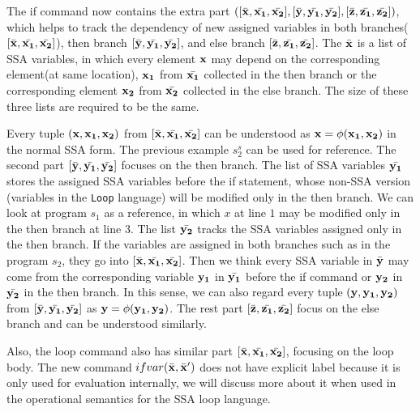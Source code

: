 The if command now contains the extra part $([\bar{{\bf{{x}}}}, \bar{{\bf{{x_1}}}}, \bar{{\bf{{x_2}}}}] , [\bar{{\bf{{y}}}}, \bar{{\bf{{y_1}}}}, \bar{{\bf{{y_2}}}}],[\bar{{\bf{{z}}}}, \bar{{\bf{{z_1}}}}, \bar{{\bf{{z_2}}}}] )$, which helps to track the dependency of new assigned variables in both branches($[\bar{{\bf{{x}}}}, \bar{{\bf{{x_1}}}}, \bar{{\bf{{x_2}}}}]$), then branch $[\bar{{\bf{{y}}}}, \bar{{\bf{{y_1}}}}, \bar{{\bf{{y_2}}}}]$, and else branch $[\bar{{\bf{{z}}}}, \bar{{\bf{{z_1}}}}, \bar{{\bf{{z_2}}}}] $. 
The $\bar{{\bf{{x}}}}$ is a list of SSA variables, in which every element ${\bf{{x}}}$ may depend on the corresponding element(at same location), ${\bf{{x_1}}}$ from $\bar{{\bf{{x_1}}}}$ collected in the then branch or the corresponding element ${\bf{{x_2}}}$ from $\bar{{\bf{{x_2}}}}$ collected in the else branch. The size of these three lists are required to be the same.

Every tuple $({\bf{{x,x_1,x_2 }}})$ from $[\bar{{\bf{{x}}}}, \bar{{\bf{{x_1}}}}, \bar{{\bf{{x_2}}}}]$ can be understood as ${\bf{{x}}} = \phi({\bf{{x_1,x_2}}})$ in the normal SSA form. The previous example $s_2^{s}$ can be used for reference. The second part $[\bar{{\bf{{y}}}}, \bar{{\bf{{y_1}}}}, \bar{{\bf{{y_2}}}}]$ focuses on the then branch. The list of SSA variables $\bar{{\bf{{y_1}}}}$ stores the assigned SSA variables before the if statement, whose non-SSA version (variables in the {\tt Loop} language) will be modified only in the then branch. We can look at program $s_1$ as a reference, in which $x$ at line $1$ may be modified only in the then branch at line $3$. The list $\bar{{\bf{{y_2}}}}$ tracks the SSA variables assigned only in the then branch. If the variables are assigned in both branches such as in the program $s_2$, they go into $[\bar{{\bf{{x}}}}, \bar{{\bf{{x_1}}}}, \bar{{\bf{{x_2}}}}]$. Then we think every SSA variable in $\bar{{\bf{{y}}}}$ may come from the corresponding variable ${\bf{{y_1}}}$ in $\bar{{\bf{{y_1}}}}$ before the if command or ${\bf{{y_2}}}$ in $\bar{{\bf{{y_2}}}}$ in the then branch. In this sense, we can also regard every tuple $({\bf{{y,y_1,y_2 }}})$ from $[\bar{{\bf{{y}}}}, \bar{{\bf{{y_1}}}}, \bar{{\bf{{y_2}}}}]$ as ${\bf{{y}}} = \phi({\bf{{y_1,y_2}}})$.  The rest part $[\bar{{\bf{{z}}}}, \bar{{\bf{{z_1}}}}, \bar{{\bf{{z_2}}}}]$ focus on the else branch and can be understood similarly.

Also, the loop command also has similar part $ [\bar{{\bf{{x}}}}, \bar{{\bf{{x_1}}}}, \bar{{\bf{{x_2}}}}]$, focusing on the loop body. The new command ${{ifvar(\bar{{\bf{{x}}}}, \bar{{\bf{{x}}}}')}}$ does not have explicit label because it is only used for evaluation internally, we will discuss more about it when used in the operational semantics for the SSA loop language. 

